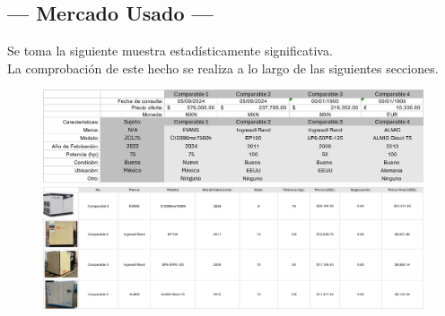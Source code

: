 \subsection{\centering --- Mercado Usado ---} %
Se toma la siguiente muestra estadísticamente significativa. \\ 
La comprobación de este hecho se realiza a lo largo de las siguientes secciones.
\begin{figure}[hbtp!]
	\centering
\includegraphics[width=  \linewidth, page = 1]{../0.imagenes/CAP_8/mercado_6_1}
\includegraphics[width=  \linewidth, page = 1]{../0.imagenes/CAP_8/mercado_6_2}
\end{figure}

